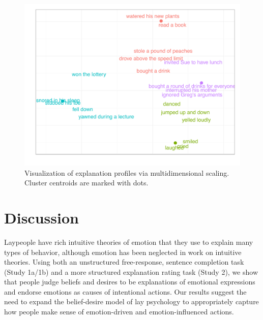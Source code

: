 \documentclass[10pt,letterpaper]{article}
\begin{document}
\begin{figure}[htb!]
\begin{center}\includegraphics[width=1\columnwidth]{images/study2MDS.pdf}\end{center}
\caption{ Visualization of explanation profiles via multidimensional scaling. Cluster centroids are marked with dots.}
\label{Study2MDSFig}
\end{figure}


\section{Discussion}

Laypeople have rich intuitive theories of emotion that they use to explain many types of behavior, although emotion has been neglected in work on intuitive theories. 
Using both an unstructured free-response, sentence completion task (Study 1a/1b) and a more structured explanation rating task (Study 2), we show that people 
judge beliefs and desires to be explanations of emotional expressions
and endorse emotions as causes of intentional actions. 
Our results suggest the need to expand the belief-desire model of lay psychology to appropriately capture how people make sense of emotion-driven and emotion-influenced actions.
\end{document}
